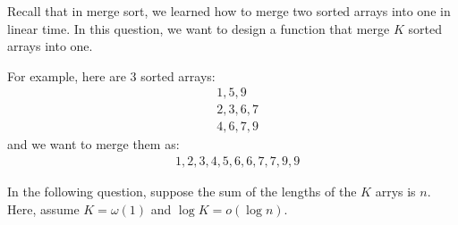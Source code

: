 
Recall that in merge sort, we learned how to merge two sorted arrays into one in linear time. In this question, we want to design a function that merge $K$ sorted arrays into one.

For example, here are 3 sorted arrays:
\begin{align*}
     & 1,5,9   \\
     & 2,3,6,7 \\
     & 4,6,7,9
\end{align*}
and we want to merge them as:
\begin{align*}
     & 1,2,3,4,5,6,6,7,7,9,9
\end{align*}

In the following question, suppose the sum of the lengths of the $K$ arrys is $n$. Here, assume $K=\omega(1)$ and $\log K=o(\log n)$.

